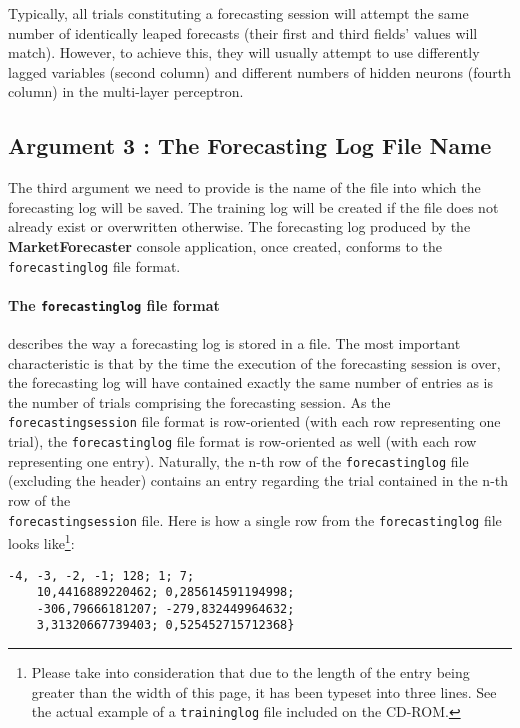 Typically, all trials constituting a forecasting session will attempt the same number of identically leaped forecasts (their first and third fields' values will match). However, to achieve this, they will usually attempt to use differently lagged variables (second column) and different numbers of hidden neurons (fourth column) in the multi-layer perceptron.

\subsection{Argument 3 : The Forecasting Log File Name}

The third argument we need to provide is the name of the file into which the forecasting log will be saved. The training log will be created if the file does not already exist or overwritten otherwise. The forecasting log produced by the \textbf{MarketForecaster} console application, once created, conforms to the \texttt{forecastinglog} file format.

\paragraph{The \texttt{forecastinglog} file format} describes the way a forecasting log is stored in a file. The most important characteristic is that by the time the execution of the forecasting session is over, the forecasting log will have contained exactly the same number of entries as is the number of trials comprising the forecasting session. As the \texttt{forecastingsession} file format is row-oriented (with each row representing one trial), the \texttt{forecastinglog} file format is row-oriented as well (with each row representing one entry). Naturally, the n-th row of the \texttt{forecastinglog} file (excluding the header) contains an entry regarding the trial contained in the n-th row of the\\
\texttt{forecastingsession} file. Here is how a single row from the \texttt{forecastinglog} file looks like\footnote{Please take into consideration that due to the length of the entry being greater than the width of this page, it has been typeset into three lines. See the actual example of a \texttt{traininglog} file included on the CD-ROM.}:

\medskip

\begin{verbatim}
-4, -3, -2, -1; 128; 1; 7;
    10,4416889220462; 0,285614591194998;
    -306,79666181207; -279,832449964632;
    3,31320667739403; 0,525452715712368}
\end{verbatim}

